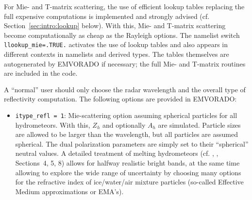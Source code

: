 \documentclass[10pt,a4paper,twoside,headinclude,footinclude,parskip=half]{scrartcl}
\newcommand{\citeNPK}[1]{\citeauthor{#1}, \citeyear{#1}}
\newcommand{\srcform}[1]{\mbox{\texttt{#1}}\xspace}%
\begin{document}
For Mie- and T-matrix scattering, the use of efficient lookup tables
replacing the full expensive computations is implemented and strongly advised (cf. Section~\ref{sec:intro:lookup} below). With this,
Mie- and T-matrix scattering become computationally as cheap as the Rayleigh options. The namelist switch \srcform{llookup_mie=.TRUE.} activates
the use of lookup tables and also appears in different contexts in namelists and derived types. The tables themselves are autogenerated by EMVORADO
if necessary; the full Mie- and T-matrix routines are included in the code.

A ``normal'' user should only choose the radar wavelength and the overall type of reflectivity computation.
The following options are provided in EMVORADO:
\begin{itemize}
\item \srcform{itype_refl = 1}: Mie-scattering option assuming spherical particles for all hydrometeors. With this, $Z_h$ and optionally $A_h$ are simulated.
  Particle sizes are allowed to be larger than the wavelength, but all particles are assumed spherical. The dual polarization parameters are simply set to their ``spherical'' neutral values.
  A detailed treatment of melting hydrometeors (cf. \citeNPK{blahak2016a}, Sections~4, 5, 8) allows for halfway realistic bright bands, at the same time allowing to explore
  the wide range of uncertainty by choosing many options for the refractive index of ice/water/air mixture particles (so-called Effective Medium
  approximations or EMA's).


\end{itemize}
\end{document}
